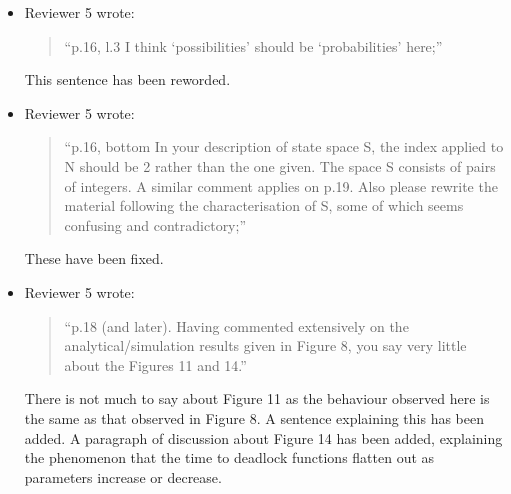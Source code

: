 \documentclass{article}
\begin{document}
\begin{itemize}
\item Reviewer 5 wrote:
\begin{quote}
``p.16, l.3 I think ‘possibilities’ should be ‘probabilities’ here;''
\end{quote}

This sentence has been reworded.


\item Reviewer 5 wrote:
\begin{quote}
``p.16, bottom In your description of state space S, the index applied to N
should be 2 rather than the one given. The space S consists of pairs of
integers. A similar comment applies on p.19. Also please rewrite the material
following the characterisation of S, some of which seems confusing and
contradictory;''
\end{quote}

These have been fixed.


\item Reviewer 5 wrote:
\begin{quote}
``p.18 (and later). Having commented extensively on the analytical/simulation
results given in Figure 8, you say very little about the Figures 11 and 14.''
\end{quote}

There is not much to say about Figure 11 as the behaviour observed here is the
same as that observed in Figure 8. A sentence explaining this has been added.
A paragraph of discussion about Figure 14 has been added, explaining the
phenomenon that the time to deadlock functions flatten out as parameters
increase or decrease.


\end{itemize}
\end{document}

